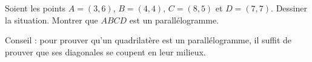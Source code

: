 
\begin{exercice}\label{exoSeconde-0055}

    Soient les points \( A=(3,6)\), \( B=(4,4)\), \( C=(8,5)\) et \( D=(7,7)\). Dessiner la situation. Montrer que \( ABCD\) est un parallélogramme.

    Conseil : pour prouver qu'un quadrilatère est un parallélogramme, il suffit de prouver que ses diagonales se coupent en leur milieux.

\end{exercice}
